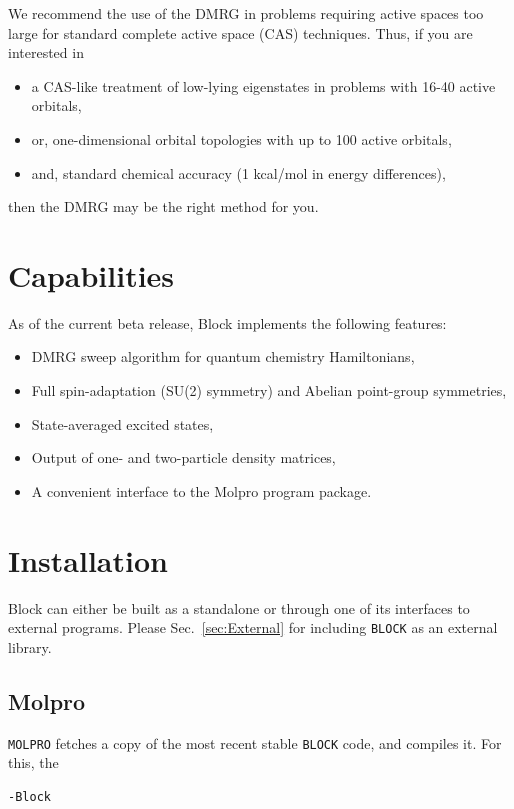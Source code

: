 \documentclass[letterpaper,12pt,aps, pra]{revtex4-1}
\begin{document}
We recommend the use of the DMRG in problems requiring active spaces too large for standard 
complete active space (CAS) techniques. Thus, if you are interested in
\begin{itemize}
\item a CAS-like treatment of low-lying eigenstates in problems with 16-40 active orbitals,
\item or, one-dimensional orbital topologies with up to 100 active orbitals,
\item and, standard chemical accuracy (1 kcal/mol in energy differences),
\end{itemize}
then the DMRG may be the right method for you.

\section{Capabilities}

As of the current beta release, Block implements the following features:
\begin{itemize}
\item DMRG sweep algorithm for quantum chemistry Hamiltonians,
\item Full spin-adaptation (SU(2) symmetry) and Abelian point-group symmetries,
\item State-averaged excited states,
\item Output of one- and two-particle density matrices,
\item A convenient interface to the Molpro program package.
\end{itemize}

\section{Installation}\label{sec:install}

Block can either be built as a standalone or through one of its interfaces to external programs. Please Sec.~\ref{sec:External} for including \texttt{BLOCK} as an external library.

\subsection{Molpro}
\texttt{MOLPRO} fetches a copy of the most recent stable \texttt{BLOCK}
code, and compiles it. For this, the

\begin{verbatim}
-Block
\end{verbatim}
\end{document}
